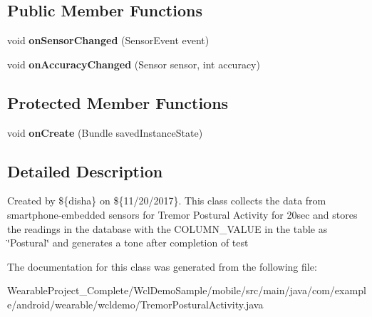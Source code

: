 \subsection*{Public Member Functions}
\begin{DoxyCompactItemize}
\item 
void {\bfseries on\+Sensor\+Changed} (Sensor\+Event event)\hypertarget{classcom_1_1example_1_1android_1_1wearable_1_1wcldemo_1_1TremorPosturalActivity_a8d0f038b8ca62502d6de6952c7944594}{}\label{classcom_1_1example_1_1android_1_1wearable_1_1wcldemo_1_1TremorPosturalActivity_a8d0f038b8ca62502d6de6952c7944594}

\item 
void {\bfseries on\+Accuracy\+Changed} (Sensor sensor, int accuracy)\hypertarget{classcom_1_1example_1_1android_1_1wearable_1_1wcldemo_1_1TremorPosturalActivity_a706a144a0511f11fc56a2e4e94943f29}{}\label{classcom_1_1example_1_1android_1_1wearable_1_1wcldemo_1_1TremorPosturalActivity_a706a144a0511f11fc56a2e4e94943f29}

\end{DoxyCompactItemize}
\subsection*{Protected Member Functions}
\begin{DoxyCompactItemize}
\item 
void {\bfseries on\+Create} (Bundle saved\+Instance\+State)\hypertarget{classcom_1_1example_1_1android_1_1wearable_1_1wcldemo_1_1TremorPosturalActivity_a7ec0ddbfc13e41e34810431f822a5dda}{}\label{classcom_1_1example_1_1android_1_1wearable_1_1wcldemo_1_1TremorPosturalActivity_a7ec0ddbfc13e41e34810431f822a5dda}

\end{DoxyCompactItemize}


\subsection{Detailed Description}
Created by \$\{disha\} on \$\{11/20/2017\}. This class collects the data from smartphone-\/embedded sensors for Tremor Postural Activity for 20sec and stores the readings in the database with the C\+O\+L\+U\+M\+N\+\_\+\+V\+A\+L\+UE in the table as \char`\"{}\+Postural\char`\"{} and generates a tone after completion of test 

The documentation for this class was generated from the following file\+:\begin{DoxyCompactItemize}
\item 
Wearable\+Project\+\_\+\+Complete/\+Wcl\+Demo\+Sample/mobile/src/main/java/com/example/android/wearable/wcldemo/Tremor\+Postural\+Activity.\+java\end{DoxyCompactItemize}
